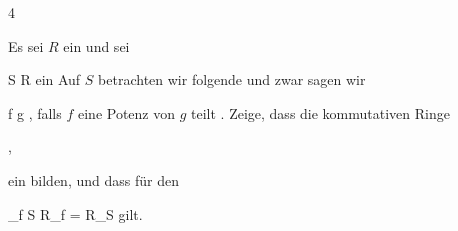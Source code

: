 {4}
{





Es sei $R$ ein
und sei

\mavergleichskette
{\vergleichskette
{S
}
{ \subseteq }{ R
}
{  }{
}
{    }{
}
{   }{
}
}
{}{}{}
ein
Auf $S$ betrachten wir folgende
 {} {}
und zwar sagen wir

\mavergleichskette
{\vergleichskette
{f
}
{ \preccurlyeq }{g
}
{  }{
}
{    }{
}
{   }{
}
}
{}{}{,}
falls $f$ eine Potenz von $g$ teilt
 {} {.}
Zeige, dass die kommutativen Ringe

 { , }

ein
bilden, und dass für den

\mavergleichskettedisp
{\vergleichskette
{ _{f \in S} R_f
}
{ =} { R_S
}
{ } {
}
{ } {
}
{ } {
}
}
{}{}{}
gilt.





}
{} {}
